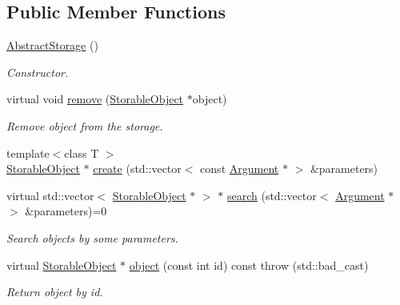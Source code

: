 \subsection*{Public Member Functions}
\begin{DoxyCompactItemize}
\item 
\hyperlink{classStorage_1_1AbstractStorage_a73fd0acd5b0f71febf5254db391416c0}{AbstractStorage} ()
\begin{DoxyCompactList}\small\item\em Constructor. \item\end{DoxyCompactList}\item 
virtual void \hyperlink{classStorage_1_1AbstractStorage_a5d114117d4954e01fd650251b829fdbf}{remove} (\hyperlink{classStorage_1_1StorableObject}{StorableObject} $\ast$object)
\begin{DoxyCompactList}\small\item\em Remove object from the storage. \item\end{DoxyCompactList}\item 
{\footnotesize template$<$class T $>$ }\\\hyperlink{classStorage_1_1StorableObject}{StorableObject} $\ast$ \hyperlink{classStorage_1_1AbstractStorage_a108af124f19c0ae9a4a461aee6abc3ec}{create} (std::vector$<$ const \hyperlink{structStorage_1_1AbstractStorage_1_1Argument}{Argument} $\ast$ $>$ \&parameters)
\item 
virtual std::vector$<$ \hyperlink{classStorage_1_1StorableObject}{StorableObject} $\ast$ $>$ $\ast$ \hyperlink{classStorage_1_1AbstractStorage_a9304eea8cd6fffd77b1ccd26f85a061c}{search} (std::vector$<$ \hyperlink{structStorage_1_1AbstractStorage_1_1Argument}{Argument} $\ast$ $>$ \&parameters)=0
\begin{DoxyCompactList}\small\item\em Search objects by some parameters. \item\end{DoxyCompactList}\item 
virtual \hyperlink{classStorage_1_1StorableObject}{StorableObject} $\ast$ \hyperlink{classStorage_1_1AbstractStorage_a21ff57c954664abb78d1d658a1da7afa}{object} (const int id) const   throw (std::bad\_\-cast)
\begin{DoxyCompactList}\small\item\em Return object by id. \item\end{DoxyCompactList}\end{DoxyCompactItemize}
